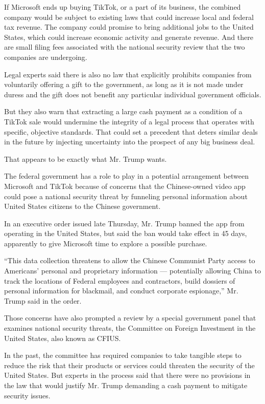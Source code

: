 If Microsoft ends up buying TikTok, or a part of its business, the
combined company would be subject to existing laws that could increase
local and federal tax revenue. The company could promise to bring
additional jobs to the United States, which could increase economic
activity and generate revenue. And there are small filing fees
associated with the national security review that the two companies are
undergoing.

Legal experts said there is also no law that explicitly prohibits
companies from voluntarily offering a gift to the government, as long as
it is not made under duress and the gift does not benefit any particular
individual government officials.

But they also warn that extracting a large cash payment as a condition
of a TikTok sale would undermine the integrity of a legal process that
operates with specific, objective standards. That could set a precedent
that deters similar deals in the future by injecting uncertainty into
the prospect of any big business deal.

That appears to be exactly what Mr. Trump wants.

The federal government has a role to play in a potential arrangement
between Microsoft and TikTok because of concerns that the Chinese-owned
video app could pose a national security threat by funneling personal
information about United States citizens to the Chinese government.

In an executive order issued late Thursday, Mr. Trump banned the app
from operating in the United States, but said the ban would take effect
in 45 days, apparently to give Microsoft time to explore a possible
purchase.

``This data collection threatens to allow the Chinese Communist Party
access to Americans' personal and proprietary information ---
potentially allowing China to track the locations of Federal employees
and contractors, build dossiers of personal information for blackmail,
and conduct corporate espionage,'' Mr. Trump said in the order.

Those concerns have also prompted a review by a special government panel
that examines national security threats, the Committee on Foreign
Investment in the United States, also known as CFIUS.

In the past, the committee has required companies to take tangible steps
to reduce the risk that their products or services could threaten the
security of the United States. But experts in the process said that
there were no provisions in the law that would justify Mr. Trump
demanding a cash payment to mitigate security issues.

